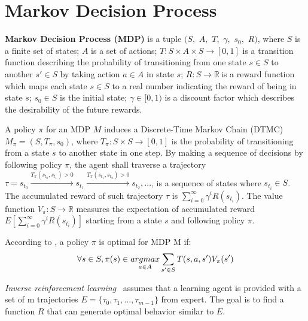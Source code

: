 \section{Markov Decision Process}
\begin{definition}
\textbf{Markov Decision Process (MDP)} is a tuple $(S,$ $A,$ $T,$ $\gamma,$ $s_0,$ $R)$, where $S$ is a finite set of states; $A$ is a set of actions; $T: S\times A\times S\rightarrow [0, 1]$ is a transition function describing the probability of transitioning from one state $s\in S$ to another $s'\in S$ by taking action $a\in A$ in state $s$; $R: S\to \mathbb{R}\ $is a reward function which maps each state $s\in S$ to a real number indicating the reward of being in state $s$; $s_0\in S$ is the initial state; $\gamma \in [0, 1)$ is a discount factor which describes the desirability of the future rewards.
\end{definition}
A policy $\pi$ for an MDP $M$ induces a Discrete-Time Markov Chain (DTMC) $M_{\pi}=(S, T_\pi, s_0)$, where $T_\pi:S\times S\to [0, 1]$ is the probability of transitioning from a state $s$ to another state in one step. By making a sequence of decisions by following policy $\pi$, the agent shall traverse a trajectory $\tau = s_{t_0}\xrightarrow{T_\pi(s_{t_0}, s_{t_1})>0} s_{t_1}\xrightarrow{T_\pi(s_{t_1}, s_{t_2})>0} s_{t_2}, ...$, is a sequence of states where $s_{t_i}\in S$. The accumulated reward of such trajectory $\tau$ is $\sum_{i=0}^\infty \gamma^i R(s_{t_i})$. The value function $V_\pi: S\to \mathbb{R}$ measures the expectation of accumulated reward $E[\sum\limits_{i=0}^{\infty}\gamma^i R(s_{t_i})]$ starting from a state $s$ and following policy $\pi$. 

According to \cite{bellman}, a policy $\pi$ is optimal for MDP M if:
\begin{equation}
\centering
\forall s\in S, \pi(s)\in \underset{a\in A}{argmax}  \sum_{s'\in S} T(s, a, s')V_{\pi}(s')
\end{equation}


\emph{Inverse reinforcement learning}~\cite{Ng:2000:AIR:645529.657801} assumes that a learning agent is provided with a set of m trajectories $E=\{\tau_0, \tau_1, ..., \tau_{m-1}\}$ from expert. The goal is to find a function $R$ that can generate optimal behavior similar to $E$. 

